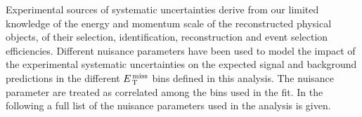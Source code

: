 Experimental sources of systematic uncertainties derive from our limited
knowledge of the energy and momentum scale of the reconstructed physical
objects, of their selection, identification, reconstruction and event selection
efficiencies. Different nuisance parameters have been used to model the impact
of the experimental systematic uncertainties on the expected signal and
background predictions in the different $E_\mathrm{\, T}^\mathrm{\, miss}$ bins defined in this
analysis. The nuisance parameter are treated as correlated among the bins used
in the fit. In the following a full list of the nuisance parameters used in the
analysis is given.

